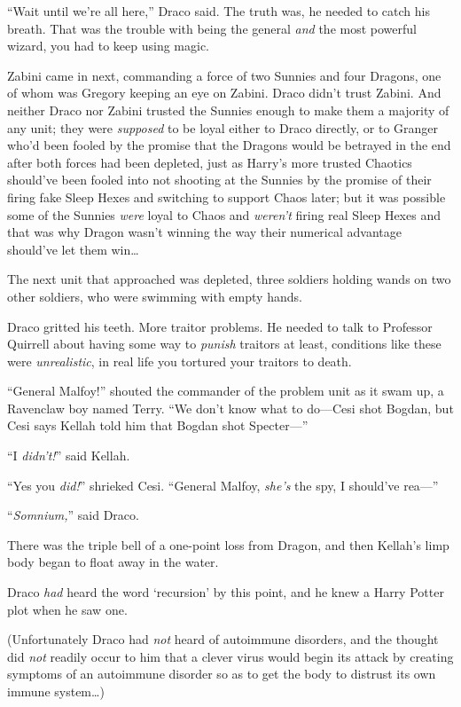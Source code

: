 “Wait until we’re all here,” Draco said. The truth was, he needed to catch his breath. That was the trouble with being the general \emph{and} the most powerful wizard, you had to keep using magic.

Zabini came in next, commanding a force of two Sunnies and four Dragons, one of whom was Gregory keeping an eye on Zabini. Draco didn’t trust Zabini. And neither Draco nor Zabini trusted the Sunnies enough to make them a majority of any unit; they were \emph{supposed} to be loyal either to Draco directly, or to Granger who’d been fooled by the promise that the Dragons would be betrayed in the end after both forces had been depleted, just as Harry’s more trusted Chaotics should’ve been fooled into not shooting at the Sunnies by the promise of their firing fake Sleep Hexes and switching to support Chaos later; but it was possible some of the Sunnies \emph{were} loyal to Chaos and \emph{weren’t} firing real Sleep Hexes and that was why Dragon wasn’t winning the way their numerical advantage should’ve let them win…

The next unit that approached was depleted, three soldiers holding wands on two other soldiers, who were swimming with empty hands.

Draco gritted his teeth. More traitor problems. He needed to talk to Professor Quirrell about having some way to \emph{punish} traitors at least, conditions like these were \emph{unrealistic}, in real life you tortured your traitors to death.

“General Malfoy!” shouted the commander of the problem unit as it swam up, a Ravenclaw boy named Terry. “We don’t know what to do—Cesi shot Bogdan, but Cesi says Kellah told him that Bogdan shot Specter—”

“I \emph{didn’t!}” said Kellah.

“Yes you \emph{did!}” shrieked Cesi. “General Malfoy, \emph{she’s} the spy, I should’ve rea—”

“\emph{Somnium,}” said Draco.

There was the triple bell of a one-point loss from Dragon, and then Kellah’s limp body began to float away in the water.

Draco \emph{had} heard the word ‘recursion’ by this point, and he knew a Harry Potter plot when he saw one.

(Unfortunately Draco had \emph{not} heard of autoimmune disorders, and the thought did \emph{not} readily occur to him that a clever virus would begin its attack by creating symptoms of an autoimmune disorder so as to get the body to distrust its own immune system…)

